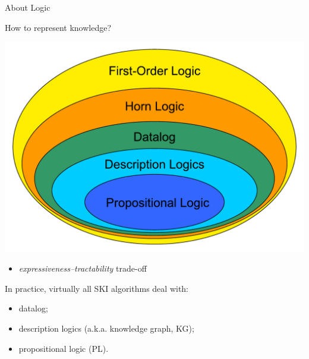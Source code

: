 \documentclass[presentation]{beamer}\mode<presentation>{\usetheme{AMSBolognaFC}}
\begin{document}
\begin{frame}[allowframebreaks]{About Logic}

    How to represent knowledge?
    \begin{center}
        \includegraphics[width=.5\linewidth]{figures/venn-logic-diagram.pdf}
    \end{center}
    \begin{itemize}
        \item \emph{expressiveness--tractability} trade-off
    \end{itemize}

    
    \framebreak        
    
    In practice, virtually all SKI algorithms deal with:
    \begin{itemize}
        \item \alert{datalog};
        \item description logics (a.k.a. \alert{knowledge graph}, KG);
        \item \alert{propositional logic} (PL).
    \end{itemize}
\end{frame}
    
\end{document}
